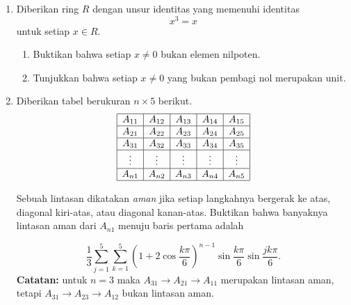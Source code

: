\documentclass[12pt,twoside]{article}
\begin{document}
\begin{enumerate}
    \item Diberikan ring $R$ dengan unsur identitas yang memenuhi identitas
          \[
              x^3=x
          \]
          untuk setiap $x\in R$.

          \begin{enumerate}
              \item Buktikan bahwa setiap $x\neq 0$ bukan elemen nilpoten.

              \item Tunjukkan bahwa setiap $x\neq 0$ yang bukan pembagi nol merupakan unit.
          \end{enumerate}

    \item Diberikan tabel berukuran $n\times 5$ berikut.
          \[
              \begin{array}{|c|c|c|c|c|}
                  \hline
                  A_{11} & A_{12} & A_{13} & A_{14} & A_{15} \\
                  \hline
                  A_{21} & A_{22} & A_{23} & A_{24} & A_{25} \\
                  \hline
                  A_{31} & A_{32} & A_{33} & A_{34} & A_{35} \\
                  \hline
                  \vdots & \vdots & \vdots & \vdots & \vdots \\
                  \hline
                  A_{n1} & A_{n2} & A_{n3} & A_{n4} & A_{n5} \\
                  \hline
              \end{array}
          \]

          Sebuah lintasan dikatakan \emph{aman} jika setiap langkahnya bergerak ke atas,
          diagonal kiri-atas, atau diagonal kanan-atas.
          Buktikan bahwa banyaknya lintasan aman dari $A_{n1}$ menuju baris pertama adalah

          \[
              \frac{1}{3}
              \sum_{j=1}^{5}
              \sum_{k=1}^{5}
              \left(1+2\cos\frac{k\pi}{6}\right)^{n-1}
              \sin\frac{k\pi}{6}
              \sin\frac{jk\pi}{6}.
          \]
          \textbf{Catatan:} untuk $n=3$ maka $A_{31}\to A_{21}\to A_{11}$ merupakan lintasan aman, tetapi $A_{31}\to A_{23}\to A_{12}$ bukan lintasan aman.
\end{enumerate}
\end{document}
